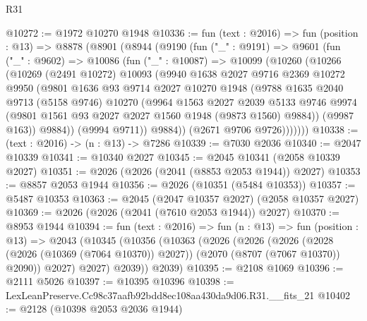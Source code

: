 \begin{lexlean}{R31}
\begin{coremodule}
@10272 := @1972 @10270 @1948
@10336 := fun (text : @2016) =>
  fun (position : @13) =>
  @8878
    (@8901
      (@8944
        (@9190
          (fun ("_" : @9191) =>
          @9601
            (fun ("_" : @9602) =>
            @10086
              (fun ("_" : @10087) =>
              @10099
                (@10260
                  (@10266
                    (@10269
                      (@2491 @10272)
                      @10093
                      (@9940
                        @1638
                        @2027
                        @9716
                        @2369
                        @10272
                        @9950
                        (@9801
                          @1636
                          @93
                          @9714
                          @2027
                          @10270
                          @1948
                          (@9788
                            @1635
                            @2040
                            @9713
                            (@5158 @9746)
                            @10270
                            (@9964
                              @1563
                              @2027
                              @2039
                              @5133
                              @9746
                              @9974
                              (@9801 @1561 @93 @2027 @2027 @1560 @1948 (@9873 @1560) @9884))
                            (@9987 @163))
                          @9884))
                      (@9994 @9711))
                    @9884))
                (@2671 @9706 @9726)))))))
@10338 := (text : @2016) -> (n : @13) -> @7286
@10339 := @7030 @2036
@10340 := @2047 @10339
@10341 := @10340 @2027
@10345 := @2045 @10341 (@2058 @10339 @2027)
@10351 := @2026 (@2026 (@2041 (@8853 @2053 @1944)) @2027)
@10353 := @8857 @2053 @1944
@10356 := @2026 (@10351 (@5484 @10353))
@10357 := @5487 @10353
@10363 := @2045 (@2047 @10357 @2027) (@2058 @10357 @2027)
@10369 := @2026 (@2026 (@2041 (@7610 @2053 @1944)) @2027)
@10370 := @8953 @1944
@10394 := fun (text : @2016) =>
  fun (n : @13) =>
  fun (position : @13) =>
  @2043
    (@10345
      (@10356
        (@10363
          (@2026
            (@2026
              (@2026
                (@2028 (@2026 (@10369 (@7064 @10370)) @2027))
                (@2070 (@8707 (@7067 @10370)) @2090))
              @2027)
            @2027)
          @2039))
      @2039)
@10395 := @2108 @1069
@10396 := @2111 @5026
@10397 := @10395 @10396
@10398 := LexLeanPreserve.Cc98c37aafb92bdd8ec108aa430da9d06.R31.__fits_21
@10402 := @2128 (@10398 @2053 @2036 @1944)

\end{coremodule}
\end{lexlean}
